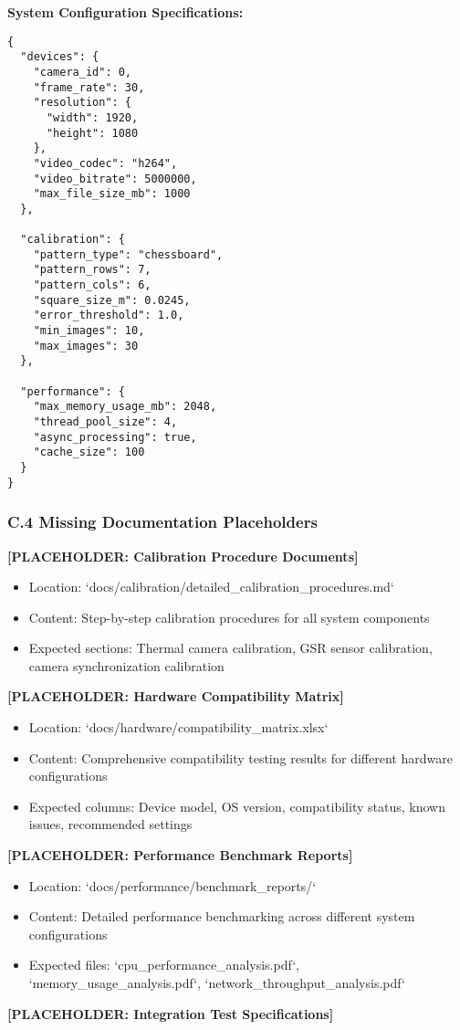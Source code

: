 \documentclass[11pt,a4paper]{article}
\begin{document}
\textbf{System Configuration Specifications:}

\begin{verbatim}
{
  "devices": {
    "camera_id": 0,
    "frame_rate": 30,
    "resolution": {
      "width": 1920,
      "height": 1080
    },
    "video_codec": "h264",
    "video_bitrate": 5000000,
    "max_file_size_mb": 1000
  },

  "calibration": {
    "pattern_type": "chessboard",
    "pattern_rows": 7,
    "pattern_cols": 6,
    "square_size_m": 0.0245,
    "error_threshold": 1.0,
    "min_images": 10,
    "max_images": 30
  },

  "performance": {
    "max_memory_usage_mb": 2048,
    "thread_pool_size": 4,
    "async_processing": true,
    "cache_size": 100
  }
}
\end{verbatim}

\subsubsection{C.4 Missing Documentation Placeholders}

\textbf{[PLACEHOLDER: Calibration Procedure Documents]}

\begin{itemize}
\item Location: `docs/calibration/detailed_calibration_procedures.md`
\item Content: Step-by-step calibration procedures for all system components
\item Expected sections: Thermal camera calibration, GSR sensor calibration, camera synchronization calibration

\end{itemize}
\textbf{[PLACEHOLDER: Hardware Compatibility Matrix]}

\begin{itemize}
\item Location: `docs/hardware/compatibility_matrix.xlsx`
\item Content: Comprehensive compatibility testing results for different hardware configurations
\item Expected columns: Device model, OS version, compatibility status, known issues, recommended settings

\end{itemize}
\textbf{[PLACEHOLDER: Performance Benchmark Reports]}

\begin{itemize}
\item Location: `docs/performance/benchmark_reports/`
\item Content: Detailed performance benchmarking across different system configurations
\item Expected files: `cpu_performance_analysis.pdf`, `memory_usage_analysis.pdf`, `network_throughput_analysis.pdf`

\end{itemize}
\textbf{[PLACEHOLDER: Integration Test Specifications]}
\end{document}
